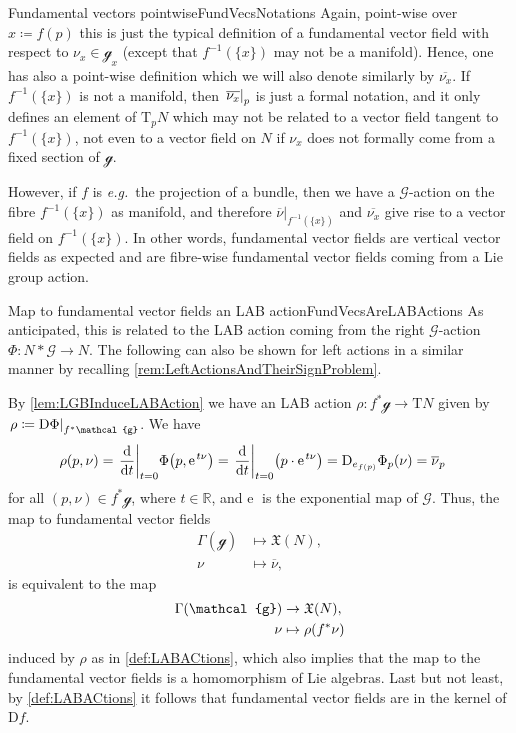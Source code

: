 \documentclass[reqno,a4paper,oneside]{amsart}
\newcommand{\e}{\ensuremath{\mathrm{e\;\!}}}
\theoremstyle{plain}
\theoremstyle{remark}
\theoremstyle{definition}
\def\bas#1\eas{\begin{align*}#1\end{align*}}
\begin{document}
\begin{remarks}{Fundamental vectors pointwise}{FundVecsNotations}
Again, point-wise over $x \coloneqq f(p)$ this is just the typical definition of a fundamental vector field with respect to $\nu_x \in \mathcal{g}_x$ (except that $f^{-1}(\{x\})$ may not be a manifold). Hence, one has also a point-wise definition which we will also denote similarly by $\overline{\nu_x}$. If $f^{-1}(\{x\})$ is not a manifold, then $\mleft.\overline{\nu_x}\mright|_p$ is just a formal notation, and it only defines an element of $\mathrm{T}_pN$ which may not be related to a vector field tangent to $f^{-1}(\{x\})$, not even to a vector field on $N$ if $\nu_x$ does not formally come from a fixed section of $\mathcal{g}$.

However, if $f$ is \textit{e.g.}\ the projection of a bundle, then we have a $\mathcal{G}$-action on the fibre $f^{-1}(\{x\})$ as manifold, and therefore $\overline{\nu}|_{f^{-1}(\{x\})}$ and $\overline{\nu_x}$ give rise to a vector field on $f^{-1}(\{x\})$. In other words, fundamental vector fields are vertical vector fields as expected and are fibre-wise fundamental vector fields coming from a Lie group action.
%
\end{remarks}

\begin{remarks}{Map to fundamental vector fields an LAB action}{FundVecsAreLABActions}
As anticipated, this is related to the LAB action coming from the right $\mathcal{G}$-action $\Phi: N*\mathcal{G} \to N$. The following can also be shown for left actions in a similar manner by recalling \ref{rem:LeftActionsAndTheirSignProblem}.

By \ref{lem:LGBInduceLABAction} we have an LAB action $\rho\colon f^*\mathcal{g} \to \mathrm{T}N$ given by $\mleft.\rho \coloneqq \mathrm{D}\Phi\mright|_{f^*\mathcal{g}}$. We have
\begin{align*}
\rho(p, \nu)
&=
\mleft. \frac{\mathrm{d}}{\mathrm{d}t} \mright|_{t=0} \Phi\mleft( p, \e^{t\nu} \mright)
=
\mleft. \frac{\mathrm{d}}{\mathrm{d}t} \mright|_{t=0} \mleft( p \cdot \e^{t\nu} \mright)
=
\mathrm{D}_{e_{f(p)}}\Phi_p(\nu)
=
\overline{\nu}_p
\end{align*}
for all $(p, \nu) \in f^*\mathcal{g}$, where $t \in \mathbb{R}$, and $\e$ is the exponential map of $\mathcal{G}$. Thus, the map to fundamental vector fields
\begin{align*}
\Gamma(\mathcal{g}) &\mapsto \mathfrak{X}(N),\\
\nu &\mapsto \overline{\nu},
\end{align*}
is equivalent to the map
\begin{align*}
\Gamma(\mathcal{g}) &\to \mathfrak{X}(N),\\
\nu &\mapsto \rho\mleft( f^*\nu \mright)
\end{align*}
induced by $\rho$ as in \ref{def:LABACtions}, which also implies that the map to the fundamental vector fields is a homomorphism of Lie algebras. Last but not least, by \ref{def:LABACtions} it follows that fundamental vector fields are in the kernel of $\mathrm{D}f$.
\end{remarks}
\end{document}
